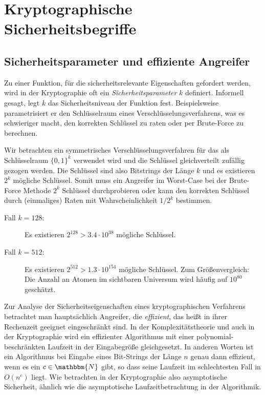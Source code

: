 \chapter{Kryptographische Sicherheitsbegriffe}
\section{Sicherheitsparameter und effiziente Angreifer}\label{sec:secparam}
Zu einer Funktion, für die sicherheitsrelevante Eigenschaften gefordert werden, wird in der Kryptographie oft ein \emph{Sicherheitsparameter} $k$ definiert. Informell gesagt, legt $k$ das Sicherheitsniveau der Funktion fest. Beispielsweise parametrisiert er den Schlüsselraum eines Verschlüsselungsverfahrens, was es schwieriger macht, den korrekten Schlüssel zu raten oder per Brute-Force zu berechnen.
\begin{beispiel}
	Wir betrachten ein symmetrisches Verschlüsselungsverfahren für das als Schlüsselraum $\{0,1\}^k$ verwendet wird und die Schlüssel gleichverteilt zufällig gezogen werden. Die Schlüssel sind also Bitstrings der Länge $k$ und es existieren $2^k$ mögliche Schlüssel. Somit muss ein Angreifer im Worst-Case bei der Brute-Force Methode $2^k$ Schlüssel durchprobieren oder kann den korrekten Schlüssel durch (einmaliges) Raten mit Wahrscheinlichkeit $1/2^k$ bestimmen. 
	\begin{description}
		\item[Fall $k=128$:] Es existieren $2^{128} > 3.4 \cdot  10^{38}$ mögliche Schlüssel. 
		\item[Fall $k=512$:] Es existieren $2^{512} > 1.3 \cdot 10^{154}$ mögliche Schlüssel. Zum Größenvergleich: 
		Die Anzahl an Atomen im sichtbaren Universum wird häufig auf $10^{80}$ geschätzt.  
	\end{description}
	
\end{beispiel}

Zur Analyse der Sicherheitseigenschaften eines kryptographischen Verfahrens betrachtet man hauptsächlich Angreifer, die \emph{effizient}, das heißt in ihrer Rechenzeit geeignet eingeschränkt sind. In der Komplexitätstheorie und auch in der Kryptographie wird ein effizienter Algorithmus mit einer polynomial-beschränkten Laufzeit in der Eingabegröße gleichgesetzt. 
In anderen Worten ist ein Algorithmus bei Eingabe eines Bit-Strings der Länge $n$ genau dann effizient, wenn es ein $c \in \mathbbm{N}$ gibt, so dass seine Laufzeit im schlechtesten Fall in $O(n^c)$ liegt. Wie betrachten in der Kryptographie also asymptotische Sicherheit, ähnlich wie die asymptotische Laufzeitbetrachtung in der Algorithmik.

